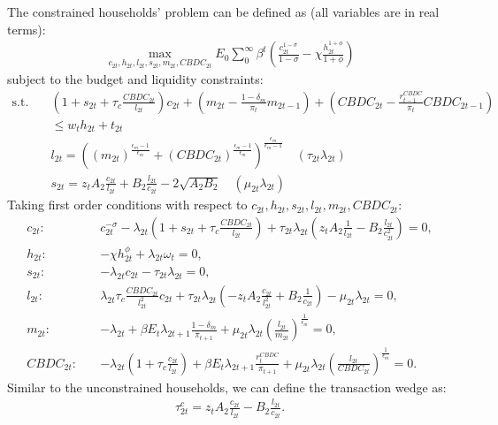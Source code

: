 \documentclass[12pt]{article}
\begin{document}
The constrained households' problem can be defined as (all variables are in real terms):
\begin{align*}
\max_{c_{2t}, h_{2t},l_{2t},s_{2t},m_{2t},CBDC_{2t}} E_0 \sum_0^{\infty}\beta^t (\frac{c_{2t}^{1-\sigma}}{1-\sigma}-\chi\frac{h_{2t}^{1+\phi}}{1+\phi})
\end{align*}
subject to the budget and liquidity constraints:
\begin{align*} 
\text{s.t.} \quad & (1+s_{2t}+\tau_c\frac{CBDC_{2t}}{l_{2t}})c_{2t}+(m_{2t}-\frac{1-\delta_m}{\pi_t}m_{2t-1})+(CBDC_{2t}-\frac{r_{t-1}^{CBDC}}{\pi_t}CBDC_{2t-1}) \\
&\leq w_th_{2t}+t_{2t}\\
&l_{2t} = ((m_{2t})^{\frac{\epsilon_m-1}{\epsilon_m}}+(CBDC_{2t})^{\frac{\epsilon_m-1}{\epsilon_m}})^{\frac{\epsilon_m}{\epsilon_m-1}}  \quad (\tau_{2t}\lambda_{2t})\\
& s_{2t} = z_tA_2\frac{c_{2t}}{l_{2t}}+B_2\frac{l_{2t}}{c_{2t}}-2\sqrt{A_2B_2} \quad (\mu_{2t}\lambda_{2t})
\end{align*}
Taking first order conditions with respect to $c_{2t}, h_{2t}, s_{2t}, l_{2t}, m_{2t}, CBDC_{2t}$: 
\begin{align}
\label{c2}
c_{2t}: \quad &c_{2t}^{-\sigma}-\lambda_{2t}(1+s_{2t}+\tau_c\frac{CBDC_{2t}}{l_{2t}})+\tau_{2t}\lambda_{2t}(z_tA_2\frac{1}{l_{2t}}-B_2\frac{l_{2t}}{c_{2t}^2}) = 0, \\
\label{h2}
h_{2t}: \quad &-\chi h_{2t}^{\phi}+\lambda_{2t}\omega_t  = 0, \\
\label{s2}
s_{2t}: \quad &-\lambda_{2t}c_{2t}-\tau_{2t}\lambda_{2t} = 0, \\
\label{l2}
l_{2t}: \quad &\lambda_{2t}\tau_c\frac{CBDC_{2t}}{l_{2t}^2}c_{2t}+\tau_{2t}\lambda_{2t}(-z_tA_2\frac{c_{2t}}{l_{2t}^2}+B_2\frac{1}{c_{2t}})-\mu_{2t}\lambda_{2t} = 0, \\
\label{m2}
m_{2t}: \quad &-\lambda_{2t}+\beta E_t\lambda_{2t+1}\frac{1-\delta_m}{\pi_{t+1}}+\mu_{2t} \lambda_{2t}(\frac{l_{2t}}{m_{2t}})^{\frac{1}{\epsilon_m}}= 0, \\
\label{CBDC2}
CBDC_{2t}: \quad &-\lambda_{2t}(1+\tau_c\frac{c_{2t}}{l_{2t}})+\beta E_t\lambda_{2t+1}\frac{r_{t}^{CBDC}}{\pi_{t+1}}+\mu_{2t} \lambda_{2t}(\frac{l_{2t}}{CBDC_{2t}})^{\frac{1}{\epsilon_m}}= 0.
\end{align}
Similar to the unconstrained households, we can define the transaction wedge as:
\begin{align}
\label{tau2c}
\tau_{2t}^c = z_tA_2\frac{c_{2t}}{l_{2t}}-B_2\frac{l_{2t}}{c_{2t}}.
\end{align}
\end{document}
